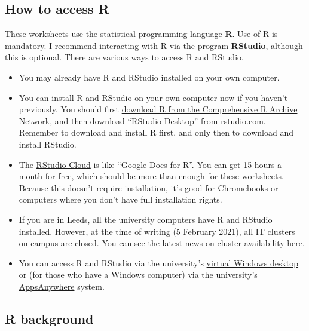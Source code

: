 \documentclass[
  a4paper,
]{article}
\providecommand{\tightlist}{%
  \setlength{\itemsep}{0pt}\setlength{\parskip}{0pt}}
\theoremstyle{definition}
\theoremstyle{definition}
\theoremstyle{definition}
\theoremstyle{remark}
\begin{document}
\hypertarget{R-access}{%
\subsection*{How to access R}\label{R-access}}

These worksheets use the statistical programming language \textbf{R}. Use of R is mandatory. I recommend interacting with R via the program \textbf{RStudio}, although this is optional. There are various ways to access R and RStudio.

\begin{itemize}
\tightlist
\item
  You may already have R and RStudio installed on your own computer.
\item
  You can install R and RStudio on your own computer now if you haven't previously. You should first \href{https://cran.rstudio.com/}{download R from the Comprehensive R Archive Network}, and then \href{https://rstudio.com/products/rstudio/download/\#download}{download ``RStudio Desktop'' from rstudio.com}. Remember to download and install R first, and only then to download and install RStudio.
\item
  The \href{https://rstudio.cloud/}{RStudio Cloud} is like ``Google Docs for R''. You can get 15 hours a month for free, which should be more than enough for these worksheets. Because this doesn't require installation, it's good for Chromebooks or computers where you don't have full installation rights.
\item
  If you are in Leeds, all the university computers have R and RStudio installed. However, at the time of writing (5 February 2021), all IT clusters on campus are closed. You can see \href{https://leeds.service-now.com/it?id=clusters}{the latest news on cluster availability here}.
\item
  You can access R and RStudio via the university's \href{https://it.leeds.ac.uk/it?id=kb_article\&sysparm_article=KB0014548}{virtual Windows desktop} or (for those who have a Windows computer) via the university's \href{https://it.leeds.ac.uk/it?id=kb_article\&sysparm_article=KB0014827}{AppsAnywhere} system.
\end{itemize}

\hypertarget{R-background}{%
\subsection*{R background}\label{R-background}}
\end{document}

